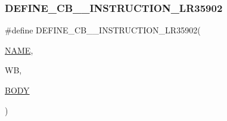 \subsubsection{\texorpdfstring{D\+E\+F\+I\+N\+E\+\_\+\+C\+B\+\_\+\_\+\+I\+N\+S\+T\+R\+U\+C\+T\+I\+O\+N\+\_\+\+L\+R35902}{DEFINE\_CB\_2\_INSTRUCTION\_LR35902}}
{\footnotesize\ttfamily \#define D\+E\+F\+I\+N\+E\+\_\+\+C\+B\+\_\+\_\+\+I\+N\+S\+T\+R\+U\+C\+T\+I\+O\+N\+\_\+\+L\+R35902(\begin{DoxyParamCaption}\item[{}]{\mbox{\hyperlink{inflate_8h_a164ea0159d5f0b5f12a646f25f99eceaa67bc2ced260a8e43805d2480a785d312}{N\+A\+ME}},  }\item[{}]{WB,  }\item[{}]{\mbox{\hyperlink{gzlog_8c_aa6bdf6a6d9916c343e1e17774d84a156}{B\+O\+DY}} }\end{DoxyParamCaption})}

